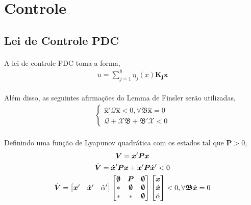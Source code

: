 \documentclass[a4paper,10pt]{article}
\begin{document}
\section{Controle}
\subsection{Lei de Controle PDC}
\paragraph{}A lei de controle PDC toma a forma,
\begin{gather}
	\boxed{u = \sum_{j=1}^{8}\eta_j(x)\bm{K_j}\bm{x}}	
\end{gather}
\paragraph{}Além disso, as seguintes afirmações do Lemma de Finsler serão utilizadas,
\begin{gather}
	\begin{cases}
		\hat{\bm{x}}'\bm{\mathcal{Q}}\hat{\bm{x}} < 0, \forall\bm{\mathfrak{B}}\hat{\bm{x}} = 0 \\
	\bm{\mathcal{Q}} + \bm{\mathcal{X}}\bm{\mathfrak{B}} + \bm{\mathfrak{B}}'\bm{\mathcal{X}} < 0	
	\end{cases}
\label{Finsler}
\end{gather}
\paragraph{}Definindo uma função de Lyapunov quadrática com os estados tal que $\bm{P}>0$, 
\begin{gather}
	\bm{V} = \bm{x}'\bm{P}\bm{x} \\
	\dot{\bm{V}} = \dot{\bm{x}}'\bm{P}\bm{x} + \bm{x}'\bm{P}\dot{\bm{x}}' < 0\\
	\dot{\bm{V}} = \begin{bmatrix}
		\bm{x}' & \dot{\bm{x}}' & \hat{\alpha}'
	\end{bmatrix}\begin{bmatrix}
	\bm{\emptyset} & \bm{P} & \bm{\emptyset} \\
	* & \bm{\emptyset} & \bm{\emptyset} \\
	* & * & \bm{\emptyset}
\end{bmatrix}\begin{bmatrix}
\bm{x} \\ \dot{\bm{x}} \\ \hat{\alpha}
\end{bmatrix} < 0, \forall\bm{\mathfrak{B}}\hat{\bm{x}} = 0
\end{gather}
\end{document}
